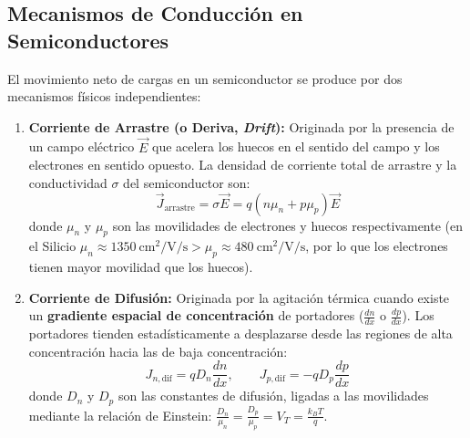 \subsection{Mecanismos de Conducción en Semiconductores}
El movimiento neto de cargas en un semiconductor se produce por dos mecanismos físicos independientes:
\begin{enumerate}[leftmargin=*]
    \item \textbf{Corriente de Arrastre (o Deriva, \textit{Drift}):} Originada por la presencia de un campo eléctrico $\vec{E}$ que acelera los huecos en el sentido del campo y los electrones en sentido opuesto. La densidad de corriente total de arrastre y la conductividad $\sigma$ del semiconductor son:
    \begin{equation}
        \vec{J}_{\text{arrastre}} = \sigma \vec{E} = q (n \mu_n + p \mu_p) \vec{E}
    \end{equation}
    donde $\mu_n$ y $\mu_p$ son las movilidades de electrones y huecos respectivamente (en el Silicio $\mu_n \approx 1350\ \si{\centi\meter\squared\per\volt\per\second} > \mu_p \approx 480\ \si{\centi\meter\squared\per\volt\per\second}$, por lo que los electrones tienen mayor movilidad que los huecos).
    \item \textbf{Corriente de Difusión:} Originada por la agitación térmica cuando existe un \textbf{gradiente espacial de concentración} de portadores ($\frac{dn}{dx}$ o $\frac{dp}{dx}$). Los portadores tienden estadísticamente a desplazarse desde las regiones de alta concentración hacia las de baja concentración:
    \begin{equation}
        J_{n,\text{dif}} = q D_n \frac{dn}{dx}, \qquad J_{p,\text{dif}} = -q D_p \frac{dp}{dx}
    \end{equation}
    donde $D_n$ y $D_p$ son las constantes de difusión, ligadas a las movilidades mediante la relación de Einstein: $\frac{D_n}{\mu_n} = \frac{D_p}{\mu_p} = V_T = \frac{k_B T}{q}$.
\end{enumerate}

